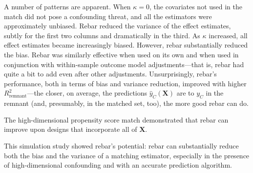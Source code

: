 \documentclass[12pt]{article}\usepackage[]{graphicx}\usepackage[]{color}
\newcommand{\covMat}{\bm{X}}
\begin{document}
A number of patterns are apparent.
When $\kappa=0$, the covariates not used in the match did not pose a
confounding threat, and all the estimators %
were approximately unbiased.
Rebar reduced the variance of the effect estimates, subtly for the first two columns and dramatically in the third.
As $\kappa$ increased, all effect estimates became increasingly biased.
However, rebar substantially reduced the bias.
Rebar was similarly effective when used on its own and when used in conjunction with within-sample outcome model adjustments---that is, rebar had quite a bit to add even after other adjustments.
Unsurprisingly, rebar's performance, both in terms of bias and
variance reduction, improved with higher $R^2_{\text{remnant}}$---the closer,
on average, the predictions $\hat{y}_C(\covMat)$ are to $y_C$ in the
remnant (and, presumably, in the matched set, too), the more good
rebar can do.

The high-dimensional propensity score match demonstrated that rebar
can improve upon designs that incorporate all of $\covMat$.

This simulation study showed rebar's potential: rebar can substantially
reduce both the bias and the variance of a matching estimator,
especially in the presence of high-dimensional confounding and with an
accurate prediction algorithm.
\end{document}
